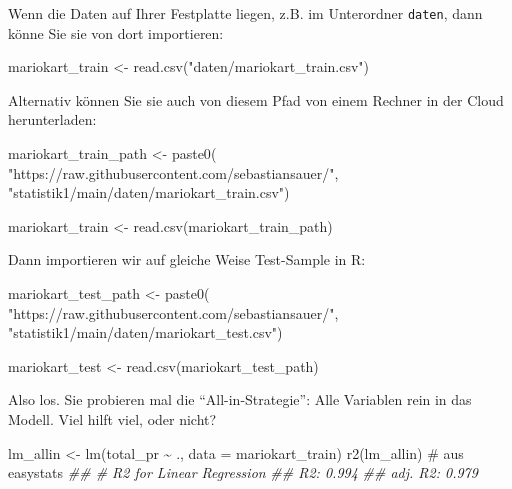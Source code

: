\documentclass[
  letterpaper,
]{scrbook}
\newenvironment{Shaded}{\begin{snugshade}}{\end{snugshade}}
\newcommand{\AttributeTok}[1]{\textcolor[rgb]{0.40,0.45,0.13}{#1}}
\newcommand{\CommentTok}[1]{\textcolor[rgb]{0.37,0.37,0.37}{#1}}
\newcommand{\DocumentationTok}[1]{\textcolor[rgb]{0.37,0.37,0.37}{\textit{#1}}}
\newcommand{\FunctionTok}[1]{\textcolor[rgb]{0.28,0.35,0.67}{#1}}
\newcommand{\NormalTok}[1]{\textcolor[rgb]{0.00,0.23,0.31}{#1}}
\newcommand{\OtherTok}[1]{\textcolor[rgb]{0.00,0.23,0.31}{#1}}
\newcommand{\SpecialCharTok}[1]{\textcolor[rgb]{0.37,0.37,0.37}{#1}}
\newcommand{\StringTok}[1]{\textcolor[rgb]{0.13,0.47,0.30}{#1}}
\theoremstyle{definition}
\theoremstyle{definition}
\theoremstyle{definition}
\theoremstyle{remark}
\begin{document}
Wenn die Daten auf Ihrer Festplatte liegen, z.B. im Unterordner
\texttt{daten}, dann könne Sie sie von dort importieren:

\begin{Shaded}
\begin{Highlighting}[]
\NormalTok{mariokart\_train }\OtherTok{\textless{}{-}} \FunctionTok{read.csv}\NormalTok{(}\StringTok{"daten/mariokart\_train.csv"}\NormalTok{)}
\end{Highlighting}
\end{Shaded}

Alternativ können Sie sie auch von diesem Pfad von einem Rechner in der
Cloud herunterladen:

\begin{Shaded}
\begin{Highlighting}[]
\NormalTok{mariokart\_train\_path }\OtherTok{\textless{}{-}} \FunctionTok{paste0}\NormalTok{( }\StringTok{"https://raw.githubusercontent.com/sebastiansauer/"}\NormalTok{,}
\StringTok{"statistik1/main/daten/mariokart\_train.csv"}\NormalTok{)}

\NormalTok{mariokart\_train }\OtherTok{\textless{}{-}} \FunctionTok{read.csv}\NormalTok{(mariokart\_train\_path)}
\end{Highlighting}
\end{Shaded}

Dann importieren wir auf gleiche Weise Test-Sample in R:

\begin{Shaded}
\begin{Highlighting}[]
\NormalTok{mariokart\_test\_path }\OtherTok{\textless{}{-}} \FunctionTok{paste0}\NormalTok{(}
 \StringTok{"https://raw.githubusercontent.com/sebastiansauer/"}\NormalTok{,}
 \StringTok{"statistik1/main/daten/mariokart\_test.csv"}\NormalTok{)}

\NormalTok{mariokart\_test }\OtherTok{\textless{}{-}} \FunctionTok{read.csv}\NormalTok{(mariokart\_test\_path)}
\end{Highlighting}
\end{Shaded}

Also los. Sie probieren mal die ``All-in-Strategie'': Alle Variablen
rein in das Modell. Viel hilft viel, oder nicht?

\begin{Shaded}
\begin{Highlighting}[]
\NormalTok{lm\_allin }\OtherTok{\textless{}{-}} \FunctionTok{lm}\NormalTok{(total\_pr }\SpecialCharTok{\textasciitilde{}}\NormalTok{ ., }\AttributeTok{data =}\NormalTok{ mariokart\_train)}
\FunctionTok{r2}\NormalTok{(lm\_allin)  }\CommentTok{\# aus easystats}
\DocumentationTok{\#\# \# R2 for Linear Regression}
\DocumentationTok{\#\#        R2: 0.994}
\DocumentationTok{\#\#   adj. R2: 0.979}
\end{Highlighting}
\end{Shaded}
\end{document}
